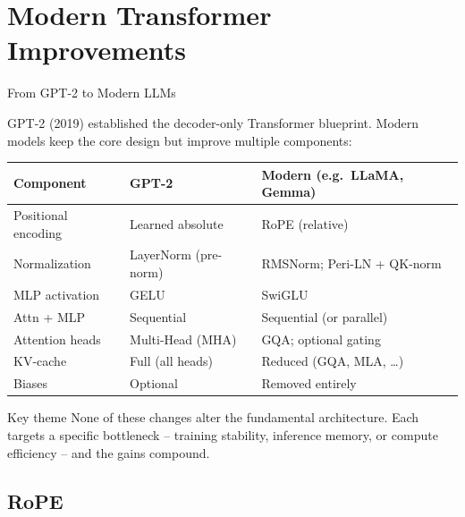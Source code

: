 
\section{Modern Transformer Improvements}

\begin{frame}{From GPT-2 to Modern LLMs}

  GPT-2 (2019) established the decoder-only Transformer blueprint. Modern models keep the core design but improve multiple components:

  \vspace{0.5em}
  \begin{center}
  {\small
  \begin{tabular}{lll}
    \toprule
    \textbf{Component} & \textbf{GPT-2} & \textbf{Modern (e.g.\ LLaMA, Gemma)} \\
    \midrule
    Positional encoding & Learned absolute & RoPE (relative) \\
    Normalization       & LayerNorm (pre-norm)  & RMSNorm; Peri-LN + QK-norm \\
    MLP activation      & GELU               & SwiGLU \\
    Attn + MLP          & Sequential         & Sequential (or parallel) \\
    Attention heads      & Multi-Head (MHA)  & GQA; optional gating \\
    KV-cache             & Full (all heads)  & Reduced (GQA, MLA, \ldots) \\
    Biases              & Optional           & Removed entirely \\
    \bottomrule
  \end{tabular}
  }
  \end{center}

  \vspace{0.5em}
  \begin{alertblock}{Key theme}
    None of these changes alter the fundamental architecture.
    Each targets a specific bottleneck -- training stability, inference memory, or compute efficiency -- and the gains compound.
  \end{alertblock}
\end{frame}


\subsection{RoPE}

